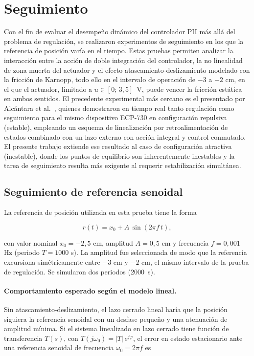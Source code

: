 \section{Seguimiento}

Con el fin de evaluar el desempeño dinámico del controlador PII más allá del problema de regulación,
se realizaron experimentos de seguimiento en los que la referencia de posición varía en el tiempo.
Estas pruebas permiten analizar la interacción entre la acción de doble integración del controlador,
la no linealidad de zona muerta del actuador y el efecto atascamiento-deslizamiento modelado con
la fricción de Karnopp, todo ello en el intervalo de operación de $-3$ a $-2$ cm, en el que el actuador, limitado a $u\in[0;\,3{,}5]$~V, puede vencer la fricción estática en ambos sentidos.
El precedente experimental más cercano es el presentado por Alcántara et al.~\cite{alcantara},
quienes demostraron en tiempo real tanto regulación como seguimiento para el mismo dispositivo
ECP-730 en configuración repulsiva (estable), empleando un esquema de linealización por
retroalimentación de estados combinado con un lazo externo con acción integral y control conmutado.
El presente trabajo extiende ese resultado al caso de configuración atractiva (inestable),
donde los puntos de equilibrio son inherentemente inestables y la tarea de seguimiento resulta
más exigente al requerir estabilización simultánea.

\subsection{Seguimiento de referencia senoidal}

La referencia de posición utilizada en esta prueba tiene la forma

\begin{equation}
  r(t) = x_0 + A\,\sin(2\pi f\, t),
  \label{eq:ref_senoidal}
\end{equation}

con valor nominal $x_0 = -2{,}5$ cm, amplitud $A = 0{,}5$ cm y frecuencia $f = 0{,}001$ Hz
(periodo $T = 1000$ s).
La amplitud fue seleccionada de modo que la referencia excursiona simétricamente entre
$-3$ cm y $-2$ cm, el mismo intervalo de la prueba de regulación. Se simularon dos periodos (2000~s).

\paragraph{Comportamiento esperado según el modelo lineal.}
Sin atascamiento-deslizamiento, el lazo cerrado lineal haría que la posición siguiera la referencia senoidal con un desfase pequeño y una atenuación de amplitud mínima. Si el sistema linealizado en lazo cerrado tiene función de transferencia $T(s)$, con $T(j\omega_0)=|T|\,e^{j\varphi}$, el error en estado estacionario ante una referencia senoidal de frecuencia $\omega_0 = 2\pi f$ es

